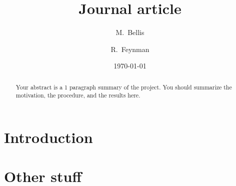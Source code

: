 \documentclass[twocolumn]{revtex4}
\begin{document}
\title{
Journal article
}

\author{M.~Bellis}
\author{R.~Feynman}

\date{\today}

\begin{abstract}
    Your abstract is a 1 paragraph summary of the project.
    You should summarize the motivation, the procedure, and the 
    results here.
\end{abstract}

\maketitle

\section{Introduction}


\section{Other stuff}

\end{document}
